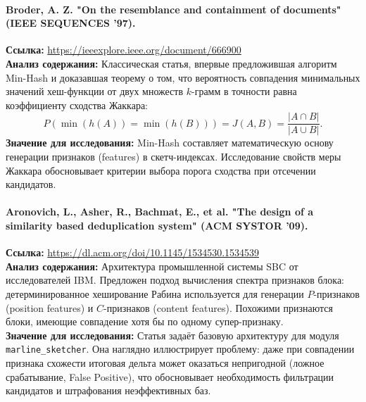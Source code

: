 \documentclass[a4paper,14pt]{extarticle}
\begin{document}
\paragraph{Broder, A. Z. "On the resemblance and containment of documents" (IEEE SEQUENCES '97).}
\textbf{Ссылка:} \url{https://ieeexplore.ieee.org/document/666900} \\
\textbf{Анализ содержания:} Классическая статья, впервые предложившая алгоритм Min-Hash и доказавшая теорему о том, что вероятность совпадения минимальных значений хеш-функции от двух множеств $k$-грамм в точности равна коэффициенту сходства Жаккара:
\begin{equation}
    P\left(\min(h(A)) = \min(h(B))\right) = J(A, B) = \frac{|A \cap B|}{|A \cup B|}.
\end{equation}
\textbf{Значение для исследования:} Min-Hash составляет математическую основу генерации признаков (features) в скетч-индексах. Исследование свойств меры Жаккара обосновывает критерии выбора порога сходства при отсечении кандидатов.

\paragraph{Aronovich, L., Asher, R., Bachmat, E., et al. "The design of a similarity based deduplication system" (ACM SYSTOR '09).}
\textbf{Ссылка:} \url{https://dl.acm.org/doi/10.1145/1534530.1534539} \\
\textbf{Анализ содержания:} Архитектура промышленной системы SBC от исследователей IBM. Предложен подход вычисления спектра признаков блока: детерминированное хеширование Рабина используется для генерации $P$-признаков (position features) и $C$-признаков (content features). Похожими признаются блоки, имеющие совпадение хотя бы по одному супер-признаку. \\
\textbf{Значение для исследования:} Статья задаёт базовую архитектуру для модуля \texttt{marline\_sketcher}. Она наглядно иллюстрирует проблему: даже при совпадении признака схожести итоговая дельта может оказаться непригодной (ложное срабатывание, False Positive), что обосновывает необходимость фильтрации кандидатов и штрафования неэффективных баз.
\end{document}
